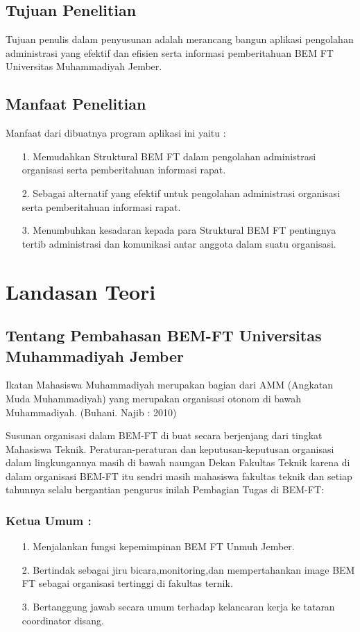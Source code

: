 \documentclass{jtetiproposalskripsi}
\begin{document}
\section{Tujuan Penelitian}
Tujuan penulis dalam penyusunan adalah merancang bangun aplikasi pengolahan administrasi yang efektif dan efisien serta informasi pemberitahuan BEM FT Universitas Muhammadiyah Jember.

\section{Manfaat Penelitian}
Manfaat dari dibuatnya program aplikasi ini yaitu :
\begin{itemize}
\item[1.] Memudahkan Struktural BEM FT dalam pengolahan administrasi organisasi serta pemberitahuan informasi rapat.
\item[2.] Sebagai alternatif yang efektif untuk pengolahan administrasi organisasi serta pemberitahuan informasi rapat. 
\item[3.] Menumbuhkan kesadaran kepada para Struktural BEM FT pentingnya tertib administrasi dan komunikasi antar anggota dalam suatu organisasi.
\end{itemize}

\chapter{Landasan Teori}
\section{Tentang Pembahasan BEM-FT Universitas Muhammadiyah Jember}

Ikatan Mahasiswa Muhammadiyah merupakan bagian dari AMM (Angkatan Muda Muhammadiyah) yang merupakan organisasi otonom di bawah Muhammadiyah. (Buhani. Najib : 2010)

Susunan organisasi dalam BEM-FT di buat secara berjenjang dari tingkat Mahasiswa Teknik.  Peraturan-peraturan dan keputusan-keputusan organisasi dalam lingkungannya masih di bawah naungan Dekan Fakultas Teknik karena di dalam organisasi BEM-FT itu sendri masih mahasiswa fakultas teknik dan setiap tahunnya selalu bergantian pengurus inilah Pembagian Tugas di BEM-FT:
\subsection{Ketua Umum :}
\begin{itemize}
\item[1.] Menjalankan fungsi kepemimpinan BEM FT Unmuh Jember.
\item[2.] Bertindak sebagai jiru bicara,monitoring,dan mempertahankan image BEM FT sebagai organisasi tertinggi di fakultas ternik.
\item[3.] Bertanggung jawab secara umum terhadap kelancaran kerja ke tataran coordinator disang.
\end{itemize}
\end{document}
